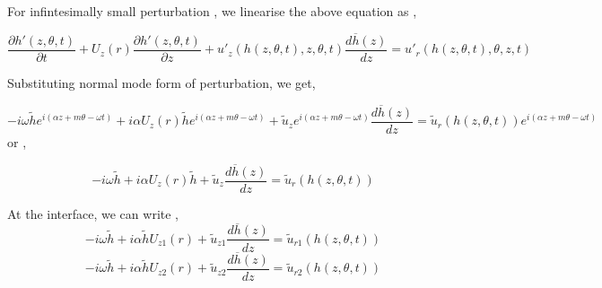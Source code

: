 \documentclass{article}
\begin{document}


For infintesimally small perturbation , we linearise the above equation as , 

\begin{equation}
\frac{\partial{h'(z,\theta,t)}}{\partial{t}} + U_{z}(r)\frac{\partial{h'(z,\theta,t)}}{\partial{z}} + u'_{z}(h(z,\theta , t),z,\theta ,t)\frac{d\overline{h}(z)}{dz} = u'_{r}(h(z,\theta,t),\theta ,z,t)
\end{equation}


Substituting normal mode form of perturbation, we get,

\begin{equation}
-i\omega \tilde{h} e^{i(\alpha z + m\theta - \omega t)} + i\alpha  U_{z}(r)\tilde{h} e^{i(\alpha z + m\theta - \omega t)} + \tilde{u}_{z} e^{i(\alpha z + m\theta - \omega t)}\frac{d\overline{h}(z)}{dz} = \tilde{u}_{r}(h(z,\theta,t))e^{i(\alpha z + m\theta - \omega t)}
\end{equation}
or ,

\begin{equation}
-i\omega \tilde{h}  + i\alpha  U_{z}(r)\tilde{h}  + \tilde{u}_{z}\frac{d\overline{h}(z)}{dz}  = \tilde{u}_{r}(h(z,\theta,t))
\end{equation}

At the interface, we can write ,
\begin{equation}
-i\omega \tilde{h} + i\alpha \tilde{h}U_{z1}(r) + \tilde{u}_{z1}\frac{d\overline{h}(z)}{dz} = \tilde{u}_{r1}(h(z,\theta , t))
\end{equation}
\begin{equation}
-i\omega \tilde{h} + i\alpha \tilde{h}U_{z2}(r) + \tilde{u}_{z2}\frac{d\overline{h}(z)}{dz} = \tilde{u}_{r2}(h(z,\theta , t))
\end{equation}
\end{document}
